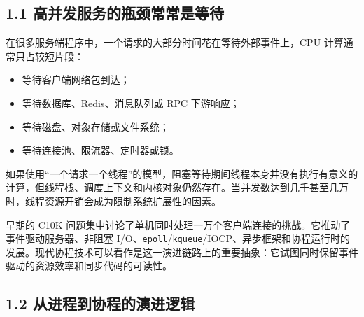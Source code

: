 \documentclass[
  11pt,
  a4paper,
]{article}
\providecommand{\tightlist}{%
  \setlength{\itemsep}{0pt}\setlength{\parskip}{0pt}}
\begin{document}
\subsection{1.1
高并发服务的瓶颈常常是等待}\label{ux9ad8ux5e76ux53d1ux670dux52a1ux7684ux74f6ux9888ux5e38ux5e38ux662fux7b49ux5f85}

在很多服务端程序中，一个请求的大部分时间花在等待外部事件上，CPU
计算通常只占较短片段：

\begin{itemize}
\tightlist
\item
  等待客户端网络包到达；
\item
  等待数据库、Redis、消息队列或 RPC 下游响应；
\item
  等待磁盘、对象存储或文件系统；
\item
  等待连接池、限流器、定时器或锁。
\end{itemize}

如果使用``一个请求一个线程''的模型，阻塞等待期间线程本身并没有执行有意义的计算，但线程栈、调度上下文和内核对象仍然存在。当并发数达到几千甚至几万时，线程资源开销会成为限制系统扩展性的因素。

早期的 C10K
问题集中讨论了单机同时处理一万个客户端连接的挑战。它推动了事件驱动服务器、非阻塞
I/O、\texttt{epoll}/\texttt{kqueue}/IOCP、异步框架和协程运行时的发展。现代协程技术可以看作是这一演进链路上的重要抽象：它试图同时保留事件驱动的资源效率和同步代码的可读性。

\subsection{1.2
从进程到协程的演进逻辑}\label{ux4eceux8fdbux7a0bux5230ux534fux7a0bux7684ux6f14ux8fdbux903bux8f91}
\end{document}
